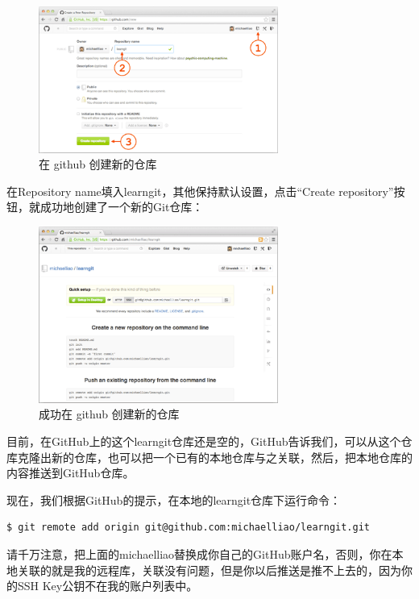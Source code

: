 \begin{figure}[h]
  \centering
  \includegraphics[width=0.7\textwidth]{img/github-create-repo-1.png}
  \caption{在 github 创建新的仓库}
  \label{fig:mesh1}
\end{figure}

在Repository name填入learngit，其他保持默认设置，点击“Create repository”按钮，就成功地创建了一个新的Git仓库：

\begin{figure}[h]
  \centering
  \includegraphics[width=0.7\textwidth]{img/github-create-repo-2.png}
  \caption{成功在 github 创建新的仓库}
  \label{fig:mesh1}
\end{figure}

目前，在GitHub上的这个learngit仓库还是空的，GitHub告诉我们，可以从这个仓库克隆出新的仓库，也可以把一个已有的本地仓库与之关联，然后，把本地仓库的内容推送到GitHub仓库。

现在，我们根据GitHub的提示，在本地的learngit仓库下运行命令：

\begin{verbatim}
$ git remote add origin git@github.com:michaelliao/learngit.git
\end{verbatim}

请千万注意，把上面的michaelliao替换成你自己的GitHub账户名，否则，你在本地关联的就是我的远程库，关联没有问题，但是你以后推送是推不上去的，因为你的SSH Key公钥不在我的账户列表中。

